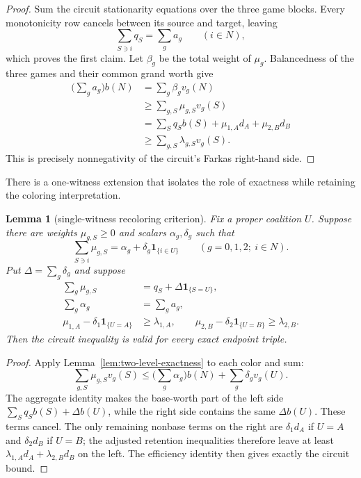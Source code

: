 \documentclass[11pt]{article}
\newtheorem{lemma}[theorem]{Lemma}
\begin{document}
\begin{proof}
Sum the circuit stationarity equations over the three game blocks. Every
monotonicity row cancels between its source and target, leaving
\[
 \sum_{S\ni i}q_S=\sum_g a_g\qquad(i\in N),
\]
which proves the first claim. Let $\beta_g$ be the total weight of
$\mu_g$. Balancedness of the three games and their common grand worth give
\begin{align*}
 \Big(\sum_g a_g\Big)b(N)
 &=\sum_g\beta_g v_g(N)\\
 &\geq \sum_{g,S}\mu_{g,S}v_g(S)\\
 &=\sum_Sq_Sb(S)+\mu_{1,A}d_A+\mu_{2,B}d_B\\
 &\geq\sum_{g,S}\lambda_{g,S}v_g(S).
\end{align*}
This is precisely nonnegativity of the circuit's Farkas right-hand side.
\end{proof}

There is a one-witness extension that isolates the role of exactness while
retaining the coloring interpretation.

\begin{lemma}[single-witness recoloring criterion]
\label{lem:single-witness-recoloring}
Fix a proper coalition $U$. Suppose there are weights $\mu_{g,S}\geq0$ and
scalars $\alpha_g,\delta_g$ such that
\[
 \sum_{S\ni i}\mu_{g,S}
 =\alpha_g+\delta_g\mathbf1_{\{i\in U\}}
 \qquad(g=0,1,2;\ i\in N).
\]
Put $\Delta=\sum_g\delta_g$ and suppose
\begin{align*}
 \sum_g\mu_{g,S}&=q_S+\Delta\mathbf1_{\{S=U\}},\\
 \sum_g\alpha_g&=\sum_g a_g,\\
 \mu_{1,A}-\delta_1\mathbf1_{\{U=A\}}&\geq\lambda_{1,A},\qquad
 \mu_{2,B}-\delta_2\mathbf1_{\{U=B\}}\geq\lambda_{2,B}.
\end{align*}
Then the circuit inequality is valid for every exact endpoint triple.
\end{lemma}

\begin{proof}
Apply Lemma~\ref{lem:two-level-exactness} to each color and sum:
\[
 \sum_{g,S}\mu_{g,S}v_g(S)
 \leq\Big(\sum_g\alpha_g\Big)b(N)+\sum_g\delta_gv_g(U).
\]
The aggregate identity makes the base-worth part of the left side
$\sum_Sq_Sb(S)+\Delta b(U)$, while the right side contains the same
$\Delta b(U)$. These terms cancel. The only remaining nonbase terms on the
right are $\delta_1d_A$ if $U=A$ and $\delta_2d_B$ if $U=B$; the adjusted
retention inequalities therefore leave at least
$\lambda_{1,A}d_A+\lambda_{2,B}d_B$ on the left. The efficiency identity
then gives exactly the circuit bound.
\end{proof}
\end{document}

